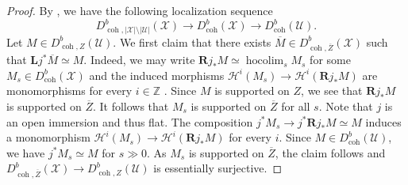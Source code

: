 \documentclass[11pt]{amsart}
\theoremstyle{plain}
\theoremstyle{definition}
\numberwithin{equation}{section}
\numberwithin{theorem}{section}
\begin{document}
\begin{proof}
    By \cite[Proposition B.1]{Hall/Lamarche/Lank/Peng:2025}, we have the following localization sequence
    \begin{displaymath}
        D^b_{\operatorname{coh},|\mathcal{X}|\setminus|\mathcal{U}|}(\mathcal{X})
        \longrightarrow D^b_{\operatorname{coh}} (\mathcal{X}) \to D^b_{\operatorname{coh}}(\mathcal{U}).
    \end{displaymath}
    Let $M\in D^b_{\operatorname{coh},Z} (\mathcal{U})$. 
    We first claim that there exists $\overline{M}\in D^b_{\operatorname{coh},\overline{Z}} (\mathcal{X})$ such that $\mathbf{L} j^\ast\overline{M}\simeq M$. 
    Indeed, we may write $\mathbf{R} j_\ast M\simeq \operatorname{hocolim}_s M_s$ for some $M_s\in D^b_{\operatorname{coh}} (\mathcal{X})$ and the induced morphisms $\mathcal{H}^{i}(M_s)\to\mathcal{H}^i(\mathbf{R} j_\ast M)$ are monomorphisms for every $i\in\mathbb{Z}$ \cite[Lemma A.3]{Hall:2022}. Since $M$ is supported on $Z$, we see that $\mathbf{R} j_\ast M$ is supported on $\overline{Z}$. 
    It follows that $M_s$ is supported on $\overline{Z}$ for all $s$. 
    Note that $j$ is an open immersion and thus flat. 
    The composition $j^\ast M_s\to j^\ast\mathbf{R} j_\ast M\simeq M$ induces a monomorphism $\mathcal{H}^{i}(M_s)\to\mathcal{H}^i(\mathbf{R} j_\ast M)$ for every $i$. 
    Since $M\in D^b_{\operatorname{coh}}(\mathcal{U})$, we have $j^\ast M_s\simeq M$ for $s\gg 0$. 
    As $M_s$ is supported on $\overline{Z}$, the claim follows and $D^b_{\operatorname{coh},\overline{Z}} (\mathcal{X}) \to D^b_{\operatorname{coh},Z}(\mathcal{U})$ is essentially surjective.


\end{proof}
\end{document}
